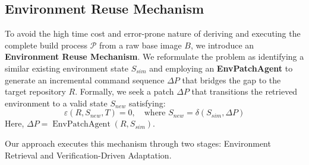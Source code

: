 \documentclass{article}
\theoremstyle{plain}
\theoremstyle{definition}
\theoremstyle{remark}
\begin{document}


\subsection{Environment Reuse Mechanism}
\label{subsec:EnvReuse}
To avoid the high time cost and error-prone nature of deriving and executing the complete build process $\mathcal{P}$ from a raw base image $B$, we introduce an \textbf{Environment Reuse Mechanism}.
We reformulate the problem as identifying a similar existing environment state $S_{sim}$ and employing an \textbf{EnvPatchAgent} to generate an incremental command sequence $\Delta P$ that bridges the gap to the target repository $R$.
Formally, we seek a patch $\Delta P$ that transitions the retrieved environment to a valid state $S_{new}$ satisfying:
\begin{equation}
    \varepsilon(R, S_{new}, T) = 0, \quad \text{where } S_{new} = \delta(S_{sim}, \Delta P)
    \label{eq:env_test_formulation}
\end{equation}
Here, $\Delta P = \operatorname{EnvPatchAgent}(R, S_{sim})$.

Our approach executes this mechanism through two stages: Environment Retrieval and Verification-Driven Adaptation.

\end{document}
